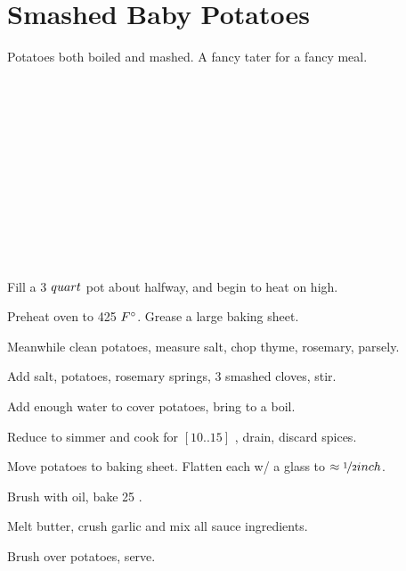 \section[Smashed Potatoes]{Smashed Baby Potatoes}


\begin{recipestats}[
	servings=6,
	preptime=10~\minute,
	bakingtime=45~\minute,
	source=Pamela Teresi,
]
\end{recipestats}

\begin{recipeabstract}
	Potatoes both boiled and mashed.
	A fancy tater for a fancy meal.
\end{recipeabstract}


\begin{ingredientcolumns}
	\columnbreak
	\begin{ingredientblock}[sauce]
		\\
		\\
		\\
		\\
		\\
		\\
		\\
	\end{ingredientblock}
	\begin{ingredientblock}[potatoes]
		\\
		\\
		\\
	\end{ingredientblock}
\end{ingredientcolumns}


\begin{preparation}
\item Fill a 3 $quart$ pot about halfway, and begin to heat on high.
\item Preheat oven to 425 $F^\circ$.
	Grease a large baking sheet.
\item Meanwhile clean potatoes, measure salt, chop thyme, rosemary, parsely.
\item Add salt, potatoes, rosemary springs, 3 smashed cloves, stir.
\item Add enough water to cover potatoes, bring to a boil.
\item Reduce to simmer and cook for $[10..15]$ \minute, drain, discard spices.
\item Move potatoes to baking sheet.
	Flatten each w/ a glass to $\approx \nicefrac{1}{2} inch$.
\item Brush with oil, bake 25 \minute.
\item Melt butter, crush garlic and mix all sauce ingredients.
\item Brush over potatoes, serve.
\end{preparation}


\recipeend%
